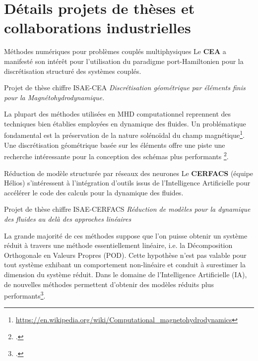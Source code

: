 \documentclass[aspectratio=169, french]{beamer}
\begin{document}
\section{Détails projets de thèses et collaborations industrielles}

\begin{frame}{Méthodes numériques pour problèmes couplés multiphysiques}
	Le \textbf{CEA} a manifesté son intérêt pour l'utilisation du paradigme port-Hamiltonien pour la discrétisation structuré des systèmes couplés.
	
	\begin{block}{Projet de thèse chiffre ISAE-CEA}
		\textit{Discrétisation géométrique par éléments finis pour la Magnétohydrodynamique.}
	\end{block}
	
	\begin{tcolorbox}
		La plupart des méthodes utilisées en MHD computationnel reprennent des techniques bien établies employées en dynamique des fluides. Un problématique fondamental est la préservation de la nature solénoïdal du champ magnétique\footnote{\url{https://en.wikipedia.org/wiki/Computational_magnetohydrodynamics}}. Une discrétisation géométrique basée sur les éléments offre une piste une recherche intéressante pour la conception des schémas plus performants \footcite{hiptmair2018div}.
	\end{tcolorbox}	
	
\end{frame}

\begin{frame}{Réduction de modèle structurée par réseaux des neurones}
	Le \textbf{CERFACS} (équipe Hélios) s'intéressent à l'intégration d'outils issus de l'Intelligence Artificielle pour accélérer le code des calculs pour la dynamique des fluides.
	
	\begin{block}{Projet de thèse chiffre ISAE-CERFACS}
		\textit{Réduction de modèles pour la dynamique des fluides au delà des approches linéaires}
	\end{block}
	\begin{tcolorbox}
		La grande majorité de ces méthodes suppose que l’on puisse obtenir un système réduit à travers une méthode essentiellement linéaire, i.e. la Décomposition Orthogonale en Valeurs Propres (POD). Cette hypothèse n’est pas valable pour tout système exhibant un comportement non-linéaire et
		conduit à surestimer la dimension du système réduit. Dans le domaine de l’Intelligence Artificielle (IA), de nouvelles méthodes permettent d’obtenir des modèles réduits plus performants\footcite{lee2020}.
	\end{tcolorbox}
	
\end{frame}
\end{document}
